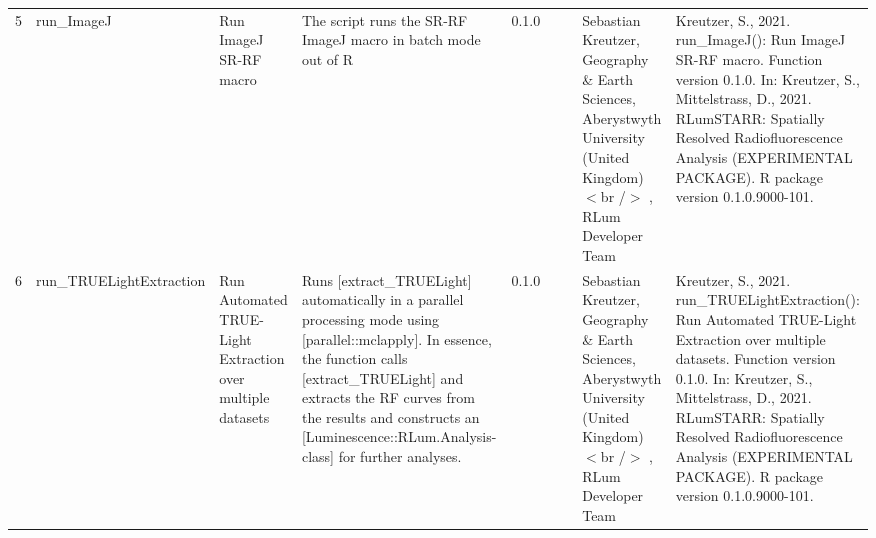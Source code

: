 \begin{table}[ht]
\begin{tabular}{rllllllll}
 \\ 
  5 & run\_ImageJ & Run ImageJ SR-RF macro & The script runs the SR-RF ImageJ macro in batch mode out of R & 0.1.0
 &  &  & Sebastian Kreutzer, Geography \& Earth Sciences, Aberystwyth University (United Kingdom)$<$br /$>$ , RLum Developer Team & Kreutzer, S., 2021. run\_ImageJ(): Run ImageJ SR-RF macro. Function version 0.1.0. In: Kreutzer, S., Mittelstrass, D., 2021. RLumSTARR: Spatially Resolved Radiofluorescence Analysis (EXPERIMENTAL PACKAGE). R package version 0.1.0.9000-101. 
 \\ 
  6 & run\_TRUELightExtraction & Run Automated TRUE-Light Extraction over multiple datasets & Runs [extract\_TRUELight] automatically in a parallel processing mode using [parallel::mclapply]. In essence, the function calls [extract\_TRUELight] and extracts the RF curves from the results and constructs an [Luminescence::RLum.Analysis-class] for further analyses. & 0.1.0
 &  &  & Sebastian Kreutzer, Geography \& Earth Sciences, Aberystwyth University (United Kingdom)$<$br /$>$ , RLum Developer Team & Kreutzer, S., 2021. run\_TRUELightExtraction(): Run Automated TRUE-Light Extraction over multiple datasets. Function version 0.1.0. In: Kreutzer, S., Mittelstrass, D., 2021. RLumSTARR: Spatially Resolved Radiofluorescence Analysis (EXPERIMENTAL PACKAGE). R package version 0.1.0.9000-101. 
 \\ 
   \hline
\end{tabular}
\end{table}


